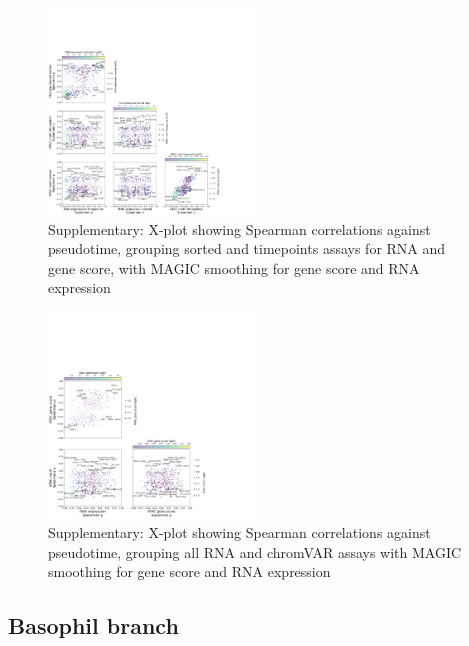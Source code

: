 \documentclass[a4paper]{article}
\begin{document}
\begin{figure}[!htb]
  \centering
  \includegraphics[width=0.5\textwidth]{../figures/hematopoiesis/MKP_40_110_smooth_magic_semi_detailed_X_plot.png}
  \caption{Supplementary: X-plot showing Spearman correlations against pseudotime, grouping sorted and timepoints assays for RNA and gene score, with MAGIC smoothing for gene score and RNA expression}
\end{figure}

\begin{figure}[!htb]
  \centering
  \includegraphics[width=0.5\textwidth]{../figures/hematopoiesis/MKP_40_110_smooth_magic_grouped_X_plot.png}
  \caption{Supplementary: X-plot showing Spearman correlations against pseudotime, grouping all RNA and chromVAR assays with MAGIC smoothing for gene score and RNA expression}
\end{figure}


\FloatBarrier
\subsection{Basophil branch}
\end{document}
